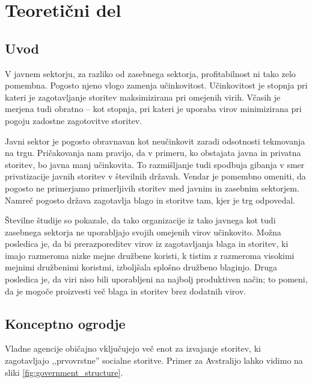 \documentclass[12pt,a4paper]{article}
\theoremstyle{definition}
\begin{document}
\setlength{\parskip}{1em}
\setlength{\parindent}{0pt}

\tableofcontents

\section{Teoretični del}

\subsection{Uvod}

V javnem sektorju, za razliko od zasebnega sektorja, profitabilnost
ni tako zelo pomembna. Pogosto njeno vlogo zamenja učinkovitost. 
Učinkovitost je stopnja pri kateri je zagotavljanje storitev maksimizirana pri omejenih 
virih. Včasih je merjena tudi obratno -- kot stopnja, pri kateri je uporaba virov 
minimizirana pri pogoju zadostne zagotovitve storitev. \cite{Lovell2002}

Javni sektor je pogosto obravnavan kot neučinkovit zaradi odsotnosti
tekmovanja na trgu. Pričakovanja nam pravijo, da v primeru, ko obstajata
javna in privatna storitev, bo javna manj učinkovita. To razmišljanje tudi
spodbuja gibanja v smer privatizacije javnih storitev v številnih državah.
Vendar je pomembno omeniti, da pogosto ne primerjamo primerljivih
storitev med javnim in zasebnim sektorjem. Namreč 
pogosto država zagotavlja blago in storitve tam, kjer je trg odpovedal.
\cite{Lovell2002}

Številne študije so pokazale, da tako organizacije iz tako javnega
kot tudi zasebnega sektorja ne uporabljajo svojih omejenih virov
učinkovito. Možna posledica je, da bi prerazporeditev virov iz
zagotavljanja blaga in storitev, ki imajo razmeroma nizke
mejne družbene koristi, k tistim z razmeroma visokimi mejnimi
družbenimi koristmi, izboljšala splošno družbeno blaginjo.
Druga posledica je, da viri niso bili uporabljeni na najbolj 
produktiven način; to pomeni, da je mogoče proizvesti več
blaga in storitev brez dodatnih virov. \cite{Yaisawarng2002}

\subsection{Konceptno ogrodje}

Vladne agencije običajno vključujejo več enot za izvajanje 
storitev, ki zagotavljajo ,,prvovrstne'' socialne storitve. 
Primer za Avstralijo lahko vidimo na sliki 
\ref{fig:government_structure}.
\end{document}
